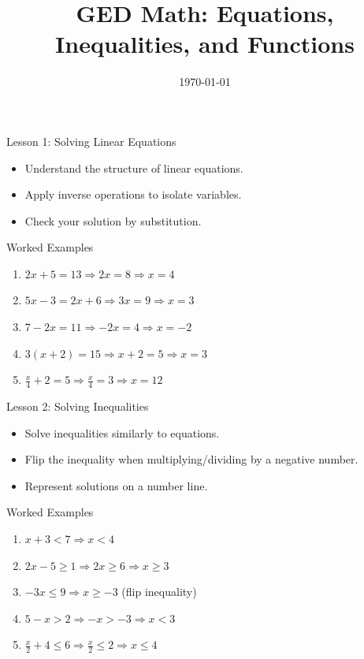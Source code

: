 \documentclass{beamer}
\title{GED Math: Equations, Inequalities, and Functions}
\date{\today}
\begin{document}
\begin{frame}
  \titlepage
\end{frame}

\begin{frame}{Lesson 1: Solving Linear Equations}
\begin{itemize}
    \item Understand the structure of linear equations.
    \item Apply inverse operations to isolate variables.
    \item Check your solution by substitution.
\end{itemize}
\end{frame}

\begin{frame}{Worked Examples}
\begin{enumerate}
  \item $2x + 5 = 13 \Rightarrow 2x = 8 \Rightarrow x = 4$
  \item $5x - 3 = 2x + 6 \Rightarrow 3x = 9 \Rightarrow x = 3$
  \item $7 - 2x = 11 \Rightarrow -2x = 4 \Rightarrow x = -2$
  \item $3(x + 2) = 15 \Rightarrow x + 2 = 5 \Rightarrow x = 3$
  \item $\frac{x}{4} + 2 = 5 \Rightarrow \frac{x}{4} = 3 \Rightarrow x = 12$
\end{enumerate}
\end{frame}

\begin{frame}{Lesson 2: Solving Inequalities}
\begin{itemize}
  \item Solve inequalities similarly to equations.
  \item Flip the inequality when multiplying/dividing by a negative number.
  \item Represent solutions on a number line.
\end{itemize}
\end{frame}

\begin{frame}{Worked Examples}
\begin{enumerate}
  \item $x + 3 < 7 \Rightarrow x < 4$
  \item $2x - 5 \geq 1 \Rightarrow 2x \geq 6 \Rightarrow x \geq 3$
  \item $-3x \leq 9 \Rightarrow x \geq -3$ (flip inequality)
  \item $5 - x > 2 \Rightarrow -x > -3 \Rightarrow x < 3$
  \item $\frac{x}{2} + 4 \leq 6 \Rightarrow \frac{x}{2} \leq 2 \Rightarrow x \leq 4$
\end{enumerate}
\end{frame}
\end{document}
